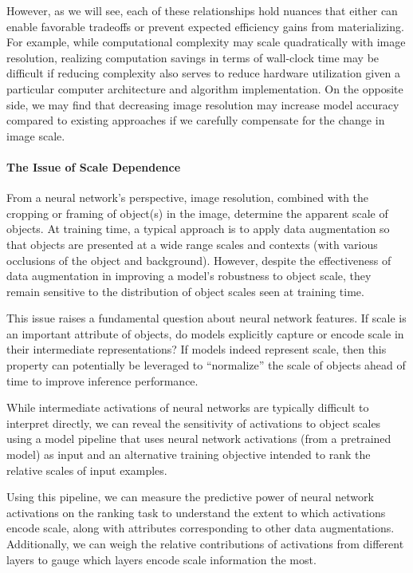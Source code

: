 However, as we will see, each of these relationships hold nuances that either can enable favorable tradeoffs or prevent expected efficiency gains from materializing.
For example, while computational complexity may scale quadratically with image resolution, realizing computation savings in terms of wall-clock time may be difficult if reducing complexity also serves to reduce hardware utilization given a particular computer architecture and algorithm implementation.
On the opposite side, we may find that decreasing image resolution may increase model accuracy compared to existing approaches if we carefully compensate for the change in image scale.


\paragraph{The Issue of Scale Dependence}
From a neural network's perspective, image resolution, combined with the cropping or framing of object(s) in the image, determine the apparent scale of objects.
At training time, a typical approach is to apply data augmentation so that objects are presented at a wide range scales and contexts (with various occlusions of the object and background).
However, despite the effectiveness of data augmentation in improving a model's robustness to object scale, they remain sensitive to the distribution of object scales seen at training time.

This issue raises a fundamental question about neural network features.
If scale is an important attribute of objects, do models explicitly capture or encode scale in their intermediate representations?
If models indeed represent scale, then this property can potentially be leveraged to ``normalize'' the scale of objects ahead of time to improve inference performance.

While intermediate activations of neural networks are typically difficult to interpret directly, we can reveal the sensitivity of activations to object scales using a model pipeline that uses neural network activations (from a pretrained model) as input and an alternative training objective intended to rank the relative scales of input examples.

Using this pipeline, we can measure the predictive power of neural network activations on the ranking task to understand the extent to which activations encode scale, along with attributes corresponding to other data augmentations.
Additionally, we can weigh the relative contributions of activations from different layers to gauge which layers encode scale information the most.

